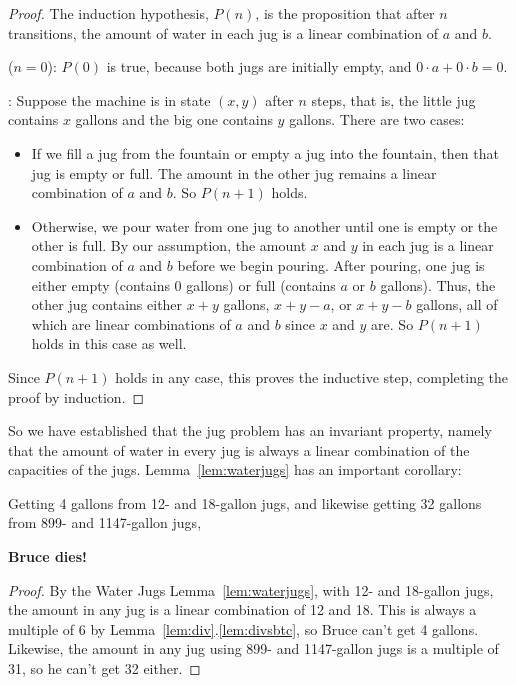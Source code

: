 \begin{proof}
The induction hypothesis, $P(n)$, is the proposition that after $n$
transitions, the amount of water in each jug is a linear combination
of $a$ and $b$.

 ($n = 0$):  $P(0)$ is true, because both jugs are
initially empty, and $0 \cdot a + 0 \cdot b = 0$.

:  Suppose the machine is in state
$(x,y)$ after $n$ steps, that is, the little jug contains $x$ gallons
and the big one contains $y$ gallons.
There are two cases:

\begin{itemize}

\item If we fill a jug from the fountain or empty a jug into the
fountain, then that jug is empty or full.  The amount in the other jug
remains a linear combination of $a$ and $b$.  So $P(n+1)$ holds.

\item Otherwise, we pour water from one jug to another until one is
  empty or the other is full.  By our assumption, the amount $x$ and
  $y$ in each jug is a linear combination of $a$ and $b$ before we
  begin pouring.  After pouring, one jug is either empty (contains 0
  gallons) or full (contains $a$ or $b$ gallons).  Thus, the other jug
  contains either $x + y$ gallons, $x + y - a$, or $x + y - b$
  gallons, all of which are linear combinations of $a$ and $b$ since
  $x$ and $y$ are.  So $P(n+1)$ holds in this case as well.
\end{itemize}
Since $P(n+1)$ holds in any case, this proves the inductive step,
completing the proof by induction.
\end{proof}

So we have established that the jug problem has an invariant property,
namely that the amount of water in every jug is always a linear
combination of the capacities of the jugs.
Lemma~\ref{lem:waterjugs} has an important corollary:
\begin{corollary*}
Getting 4 gallons from 12- and 18-gallon jugs, and likewise
getting 32 gallons from 899- and 1147-gallon jugs,
\begin{center}
\textbf{Bruce dies!}
\end{center}
\end{corollary*}

\begin{proof}
By the Water Jugs Lemma~\ref{lem:waterjugs}, with 12- and 18-gallon
jugs, the amount in any jug is a linear combination of 12 and 18.
This is always a multiple of 6 by
Lemma~\ref{lem:div}.\ref{lem:divsbtc}, so Bruce can't get 4 gallons.
Likewise, the amount in any jug using 899- and 1147-gallon jugs is a
multiple of 31, so he can't get 32 either.
\end{proof}

